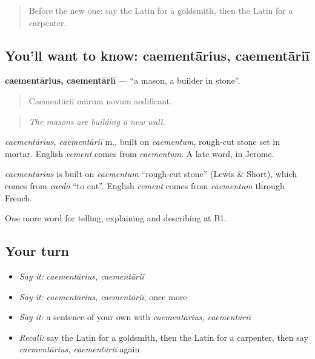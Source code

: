 \begin{quote}
Before the new one: say the Latin for a goldsmith, then the Latin for a carpenter.
\end{quote}

\subsection*{You'll want to know: caementārius, caementāriī}
\textbf{caementārius, caementāriī} — \textquotedblleft{}a mason, a builder in stone\textquotedblright{}.

\begin{quote}
Caementāriī mūrum novum aedificant.
\end{quote}

\begin{quote}
\emph{The masons are building a new wall.}
\end{quote}

\emph{caementārius, caementāriī} m., built on \emph{caementum}, rough-cut stone set in mortar. English \emph{cement} comes from \emph{caementum}. A late word, in Jerome.

\begin{cousinweb}
\emph{caementārius} is built on \emph{caementum} \textquotedblleft{}rough-cut stone\textquotedblright{} (Lewis \& Short), which comes from \emph{caedō} \textquotedblleft{}to cut\textquotedblright{}. English \emph{cement} comes from \emph{caementum} through French.
\end{cousinweb}

\begin{grammarlens}[title={What you've built}]
One more word for telling, explaining and describing at B1.
\end{grammarlens}

\subsection*{Your turn}
\begin{itemize}
\raggedright
  \item \emph{Say it:} \emph{caementārius, caementāriī}
  \item \emph{Say it:} \emph{caementārius, caementāriī}, once more
  \item \emph{Say it:} a sentence of your own with \emph{caementārius, caementāriī}
  \item \emph{Recall:} say the Latin for a goldsmith, then the Latin for a carpenter, then say \emph{caementārius, caementāriī} again
\end{itemize}

